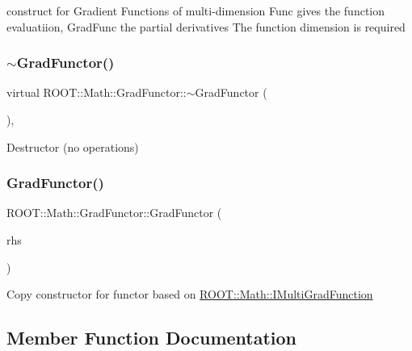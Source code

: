 construct for Gradient Functions of multi-\/dimension Func gives the function evaluatiion, Grad\+Func the partial derivatives The function dimension is required \mbox{\label{classROOT_1_1Math_1_1GradFunctor_a1dfc4e8382f679a935eae97c5e7ee4dd}} 
\subsubsection{\texorpdfstring{$\sim$GradFunctor()}{~GradFunctor()}\hspace{0.1cm}{\footnotesize\ttfamily [3/3]}}
{\footnotesize\ttfamily virtual R\+O\+O\+T\+::\+Math\+::\+Grad\+Functor\+::$\sim$\+Grad\+Functor (\begin{DoxyParamCaption}{ }\end{DoxyParamCaption})\hspace{0.3cm}{\ttfamily [inline]}, {\ttfamily [virtual]}}

Destructor (no operations) \mbox{\label{classROOT_1_1Math_1_1GradFunctor_a629b55d9f326dbf39e5c3ccfb4678579}} 
\subsubsection{\texorpdfstring{GradFunctor()}{GradFunctor()}\hspace{0.1cm}{\footnotesize\ttfamily [15/15]}}
{\footnotesize\ttfamily R\+O\+O\+T\+::\+Math\+::\+Grad\+Functor\+::\+Grad\+Functor (\begin{DoxyParamCaption}\item[{const \mbox{\hyperlink{classROOT_1_1Math_1_1GradFunctor}{Grad\+Functor}} \&}]{rhs }\end{DoxyParamCaption})\hspace{0.3cm}{\ttfamily [inline]}}

Copy constructor for functor based on \mbox{\hyperlink{namespaceROOT_1_1Math_a014e019aaf9304a00e9231bd9ed232fb}{R\+O\+O\+T\+::\+Math\+::\+I\+Multi\+Grad\+Function}} 

\subsection{Member Function Documentation}
\mbox{\label{classROOT_1_1Math_1_1GradFunctor_a21093c0d3001069e49ce6278b5a32a40}} 
